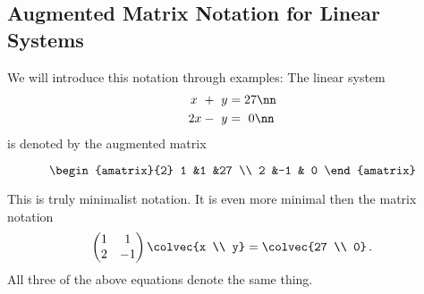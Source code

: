 \subsection{Augmented Matrix Notation for Linear Systems}

We will introduce this notation through examples: 
The linear system 
\begin{align}
	x\ +\ y & = 27\nn \\
	2x-\ y & =\  0\nn \,
\end{align}
is denoted by the augmented matrix

\[
\begin{amatrix}{2}
1 &1 &27 \\ 2 &-1 & 0
\end{amatrix}
\]

\noindent
This is truly minimalist notation. It is even more minimal then the matrix notation  
\begin{equation*}
    \begin{pmatrix}
      1             &1  \\
      2             &-1
    \end{pmatrix}
  \colvec{x \\ y}
  =
  \colvec{27 \\ 0}\, .
\end{equation*}
All three of the above equations denote the same thing. 



